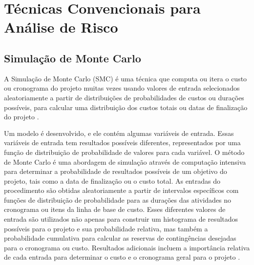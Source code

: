 \section{Técnicas Convencionais para Análise de Risco}

\subsection{Simulação de Monte Carlo}

A Simulação de Monte Carlo (SMC) é uma técnica que computa ou itera o custo ou cronograma do projeto muitas vezes usando valores de entrada selecionados aleatoriamente a partir de distribuições de probabilidades de custos ou durações possíveis, para calcular uma distribuição dos custos totais ou datas de finalização do projeto \cite{PMBOK2008}.

Um modelo é desenvolvido, e ele contém algumas variáveis de entrada. Essas variáveis de entrada tem resultados possíveis diferentes, representados por uma função de distribuição de probabilidade de valores para cada variável. O método de Monte Carlo é uma abordagem de simulação através de computação intensiva para determinar a probabilidade de resultados possíveis de um objetivo do projeto, tais como a data de finalização ou o custo total. As entradas do procedimento são obtidas aleatoriamente a partir de intervalos específicos com funções de distribuição de probabilidade para as durações das atividades no cronograma ou itens da linha de base de custo. Esses diferentes valores de entrada são utilizados não apenas para construir um histograma de resultados possíveis para o projeto e sua probabilidade relativa, mas também a probabilidade cumulativa para calcular as reservas de contingências desejadas para o cronograma ou custo. Resultados adicionais incluem a importância relativa de cada entrada para determinar o custo e o cronograma geral para o projeto \cite{kwak2007exploring}.

